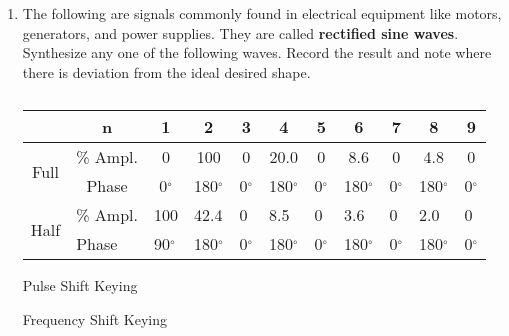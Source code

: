 \begin{enumerate}
\begin{table}[h]
\caption{ }
\label{tab:fs2}
\end{table}


\item The following are signals commonly found in electrical equipment like motors, generators, and power supplies. They are called {\bf rectified sine waves}. Synthesize any one of the following waves. Record the result and note where there is deviation from the ideal desired shape.


\begin{table}[h]
\small
\begin{tabular}{c|c|c|c|c|c|c|c|c|c|c|}
\cline{2-11}
&n&1&2&3&4&5&6&7&8&9\\ \hline
\multicolumn{1}{|c|}{\multirow{2}{*}{Full}}&\% Ampl.&0&100&0&20.0&0&8.6&0&4.8&0\\
\multicolumn{1}{|c|}{}&Phase&0$^{\circ}$&180$^{\circ}$&0$^{\circ}$&180$^{\circ}$&0$^{\circ}$&180$^{\circ}$&0$^{\circ}$&180$^{\circ}$&0$^{\circ}$\\ \hline
\multicolumn{1}{|l|}{\multirow{2}{*}{Half}}&\multicolumn{1}{l|}{\% Ampl.}&\multicolumn{1}{l|}{100}&\multicolumn{1}{l|}{42.4}&\multicolumn{1}{l|}{0}&\multicolumn{1}{l|}{8.5}&\multicolumn{1}{l|}{0}&\multicolumn{1}{l|}{3.6}&\multicolumn{1}{l|}{0}&\multicolumn{1}{l|}{2.0}&\multicolumn{1}{l|}{0}\\
\multicolumn{1}{|l|}{}&\multicolumn{1}{l|}{Phase}&\multicolumn{1}{l|}{90$^{\circ}$}&\multicolumn{1}{l|}{180$^{\circ}$}&\multicolumn{1}{l|}{0$^{\circ}$}&\multicolumn{1}{l|}{180$^{\circ}$}&\multicolumn{1}{l|}{0$^{\circ}$}&\multicolumn{1}{l|}{180$^{\circ}$}&\multicolumn{1}{l|}{0$^{\circ}$}&\multicolumn{1}{l|}{180$^{\circ}$}&\multicolumn{1}{l|}{0$^{\circ}$}\\ \hline
\end{tabular}
\normalsize

\caption{ }
\label{tab:fs3}
\end{table}

\begin{marginfigure}[+1in]
\caption*{Pulse Shift Keying}
\label{fig:fs11}
\end{marginfigure}

\begin{marginfigure}[+0in]
\caption*{Frequency Shift Keying}
\label{fig:fs12}
\end{marginfigure}


\end{enumerate}
